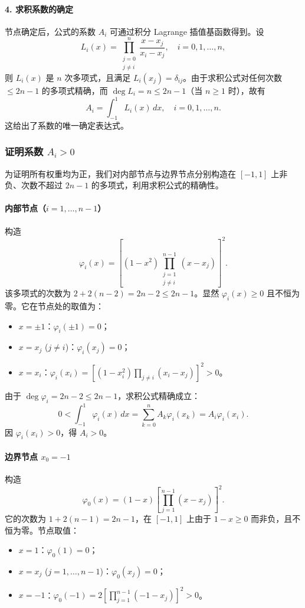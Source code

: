 \documentclass{article}
\begin{document}
\paragraph{4. 求积系数的确定}

节点确定后，公式的系数 \(A_i\) 可通过积分 Lagrange 插值基函数得到。设
\[
L_i(x) = \prod_{\substack{j=0 \\ j \neq i}}^{n} \frac{x-x_j}{x_i-x_j}, \quad i=0,1,\dots,n,
\]
则 \(L_i(x)\) 是 \(n\) 次多项式，且满足 \(L_i(x_j) = \delta_{ij}\)。由于求积公式对任何次数 \(\le 2n-1\) 的多项式精确，而 \(\deg L_i = n \le 2n-1\)（当 \(n\ge 1\) 时），故有
\[
A_i = \int_{-1}^{1} L_i(x) \,dx, \quad i=0,1,\dots,n.
\]
这给出了系数的唯一确定表达式。

\subsubsection*{证明系数 \(A_i > 0\)}

为证明所有权重均为正，我们对内部节点与边界节点分别构造在 \([-1,1]\) 上非负、次数不超过 \(2n-1\) 的多项式，利用求积公式的精确性。

\paragraph{内部节点（\(i = 1,\dots,n-1\)）}
构造
\[
\varphi_i(x) = \left[ (1-x^2) \prod_{\substack{j=1 \\ j \neq i}}^{n-1} (x-x_j) \right]^2.
\]
该多项式的次数为 \(2 + 2(n-2) = 2n-2 \le 2n-1\)。显然 \(\varphi_i(x) \ge 0\) 且不恒为零。它在节点处的取值为：
\begin{itemize}
    \item \(x = \pm 1\)：\(\varphi_i(\pm 1) = 0\)；
    \item \(x = x_j\) (\(j \neq i\))：\(\varphi_i(x_j) = 0\)；
    \item \(x = x_i\)：\(\varphi_i(x_i) = \left[ (1-x_i^2) \prod_{j \neq i} (x_i-x_j) \right]^2 > 0\)。
\end{itemize}

由于 \(\deg \varphi_i = 2n-2 \le 2n-1\)，求积公式精确成立：
\[
0 < \int_{-1}^{1} \varphi_i(x) \,dx = \sum_{k=0}^{n} A_k \varphi_i(x_k) = A_i \varphi_i(x_i).
\]
因 \(\varphi_i(x_i) > 0\)，得 \(A_i > 0\)。

\paragraph{边界节点 \(x_0 = -1\)}
构造
\[
\varphi_0(x) = (1-x) \left[ \prod_{j=1}^{n-1} (x-x_j) \right]^2.
\]
它的次数为 \(1 + 2(n-1) = 2n-1\)，在 \([-1,1]\) 上由于 \(1-x \ge 0\) 而非负，且不恒为零。节点取值：
\begin{itemize}
    \item \(x = 1\)：\(\varphi_0(1) = 0\)；
    \item \(x = x_j\) (\(j=1,\dots,n-1\))：\(\varphi_0(x_j) = 0\)；
    \item \(x = -1\)：\(\varphi_0(-1) = 2 \left[ \prod_{j=1}^{n-1} (-1-x_j) \right]^2 > 0\)。
\end{itemize}
\end{document}
